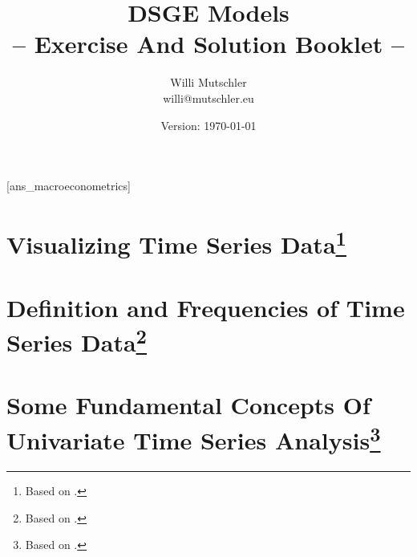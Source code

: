 \documentclass[a4paper]{scrartcl}
\newif\ifpartINTRO
\newif\ifpartTSA
\newcommand{\myTitle}{
    DSGE Models
}
\begin{document}
\title{\myTitle\\ -- Exercise And Solution Booklet --}
\author{Willi Mutschler\\willi@mutschler.eu}
\date{Version: \today}
\maketitle \thispagestyle{empty}

\newpage
{}[ans_macroeconometrics]

\renewcommand{\contentsname}{Overview}

\tableofcontents\thispagestyle{empty}
\newpage

\ifpartINTRO	
    \section[Macroeconometrics]{%
      Macroeconometrics%
      \footnote{Based on \cite{Schorfheide.2010} and \cite{FernandezVillaverdeRubioRamirez.2010}.}%
      \label{ex:Macroeconometrics}%
     }
    
    \setcounter{page}{1}
    
    
\fi


\ifpartTSA
    \section[Visualizing Time Series Data]{%
      Visualizing Time Series Data\footnote{Based on \citet[Ch.~1]{BjornlandThorsrud.2015}.}%
     }
    \label{ex:VisualizingTSData}
    
    
    \section[Definition and Frequencies of Time Series Data]{%
      Definition and Frequencies of Time Series Data\footnote{Based on \citet[Ch.~2]{BjornlandThorsrud.2015}.}%
     }
    \label{ex:DefFreqTS}
    
    
    \section[Some Fundamental Concepts Of Univariate Time Series Analysis]{%
      Some Fundamental Concepts Of Univariate Time Series Analysis\footnote{Based on \citet[Ch.~2]{BjornlandThorsrud.2015}.}%
     }
    \label{ex:FundamentalConceptsUnivariateTSA}
    
    
\end{document}
